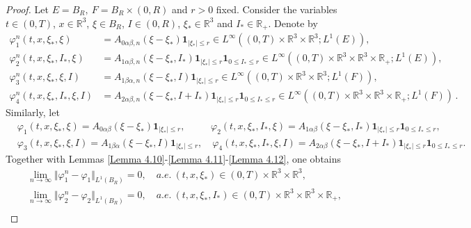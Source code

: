 \documentclass[reqno,11pt]{amsart}
\numberwithin{equation}{section}
\def\R{\mathbb{R}}
\begin{document}
\begin{proof}

Let $E=B_R,\ F=B_R\times (0,R)$ and $r > 0$ fixed. Consider the variables $t \in (0, T)$, $x \in \R^3$, $\xi \in B_R$, $I \in (0, R)$, $\xi_* \in \R^3$ and $I_* \in \R_+$. Denote by
\begin{equation*}
	\begin{aligned}
		\varphi^n_1 (t, x, \xi_*, \xi) & = A_{0\alpha \beta ,n}(\xi -\xi_* ) \mathbf{1}_{|\xi_* |\leq r} \in L^\infty ((0,T)\times \R^3 \times \R^3; L^1(E)), \\
		\varphi^n_2 (t, x, \xi_*, I_*,\xi) & = A_{1\alpha \beta ,n}(\xi -\xi_* ,I_* ) \mathbf{1}_{|\xi_* |\leq r} \mathbf{1}_{0 \leq I_* \leq r} \in L^\infty ((0,T)\times \R^3 \times \R^3 \times \R_+; L^1(E)),\\
		\varphi^n_3 (t, x, \xi_*, \xi, I) & = A_{1\beta \alpha ,n}(\xi -\xi_* ,I) \mathbf{1}_{|\xi_* |\leq r} \in L^\infty ((0,T)\times \R^3 \times \R^3; L^1(F)), \\
		\varphi^n_4 (t, x, \xi_*, I_*, \xi, I) & = A_{2\alpha \beta ,n}(\xi -\xi_* ,I+I_* ) \mathbf{1}_{|\xi_* |\leq r} \mathbf{1}_{0 \leq I_* \leq r} \in L^\infty ((0,T)\times \R^3 \times \R^3\times \R_+; L^1(F)) \,.
	\end{aligned}
\end{equation*}
Similarly, let
\begin{equation*}
	\begin{aligned}
		& \varphi_1 (t, x, \xi_*, \xi) = A_{0\alpha \beta }(\xi -\xi_* ) \mathbf{1}_{|\xi_* |\leq r}, \quad \quad \ \ \, \varphi_2 (t, x, \xi_*, I_*, \xi ) = A_{1\alpha \beta }(\xi -\xi_* ,I_* ) \mathbf{1}_{|\xi_* |\leq r} \mathbf{1}_{0 \leq I_* \leq r}, \\
		&\varphi_3 (t, x, \xi_*, \xi, I) = A_{1\beta \alpha}(\xi -\xi_* ,I) \mathbf{1}_{|\xi_* |\leq r}, \quad \varphi_4 (t, x, \xi_*, I_*, \xi, I ) = A_{2\alpha \beta }(\xi -\xi_* ,I+I_* ) \mathbf{1}_{|\xi_* |\leq r} \mathbf{1}_{0 \leq I_* \leq r}.
	\end{aligned}
\end{equation*}
Together with Lemmas \ref{Lemma 4.10}-\ref{Lemma 4.11}-\ref{Lemma 4.12}, one obtains  
\begin{equation*}
	\begin{aligned}
		& \lim \limits_{n\rightarrow \infty } \Vert \varphi^n_1 -\varphi_1 \Vert_{L^1(B_R)}=0, \quad a.e. \ (t,x,\xi_*) \in (0,T) \times \R^3 \times \R^3, \\
		& \lim \limits_{n\rightarrow \infty } \Vert \varphi^n_2 -\varphi_2 \Vert_{L^1(B_R)}=0, \quad a.e. \ (t,x,\xi_* ,I_*) \in (0,T)\times \R^3 \times \R^3 \times \R_+, \\

\end{aligned}
\end{equation*}
\end{proof}
\end{document}
